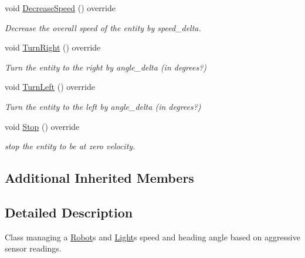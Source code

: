 \begin{DoxyCompactItemize}
\mbox{\label{class_motion_handler_robot_aggressive_a3f356f4caa6bdbed06c951f27a5cad76}} 
void \mbox{\hyperlink{class_motion_handler_robot_aggressive_a3f356f4caa6bdbed06c951f27a5cad76}{Decrease\+Speed}} () override
\begin{DoxyCompactList}\small\item\em Decrease the overall speed of the entity by speed\+\_\+delta. \end{DoxyCompactList}\item 
\mbox{\label{class_motion_handler_robot_aggressive_a848029187d0e50d64a2a1b91a0f7c541}} 
void \mbox{\hyperlink{class_motion_handler_robot_aggressive_a848029187d0e50d64a2a1b91a0f7c541}{Turn\+Right}} () override
\begin{DoxyCompactList}\small\item\em Turn the entity to the right by angle\+\_\+delta (in degrees?) \end{DoxyCompactList}\item 
\mbox{\label{class_motion_handler_robot_aggressive_a67f0e31a85f979273896433ddfb38a61}} 
void \mbox{\hyperlink{class_motion_handler_robot_aggressive_a67f0e31a85f979273896433ddfb38a61}{Turn\+Left}} () override
\begin{DoxyCompactList}\small\item\em Turn the entity to the left by angle\+\_\+delta (in degrees?) \end{DoxyCompactList}\item 
\mbox{\label{class_motion_handler_robot_aggressive_a8c4e7489817fb53fda12a17bc044d76b}} 
void \mbox{\hyperlink{class_motion_handler_robot_aggressive_a8c4e7489817fb53fda12a17bc044d76b}{Stop}} () override
\begin{DoxyCompactList}\small\item\em stop the entity to be at zero velocity. \end{DoxyCompactList}\end{DoxyCompactItemize}
\subsection*{Additional Inherited Members}


\subsection{Detailed Description}
Class managing a \mbox{\hyperlink{class_robot}{Robot}}\textquotesingle{}s and \mbox{\hyperlink{class_light}{Light}}\textquotesingle{}s speed and heading angle based on aggressive sensor readings. 

